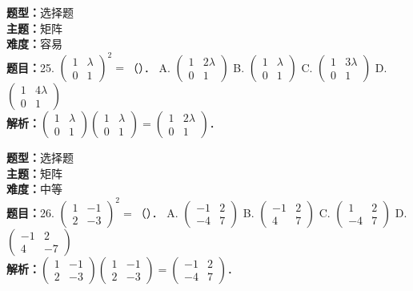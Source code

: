 \documentclass{ctexart}
\newenvironment{question}[5]{%
	\noindent\textbf{题型：}#1\\
	\textbf{主题：}#2\\
	\textbf{难度：}#3\\
	\textbf{题目：}#4\\
	\textbf{解析：}#5\\
	\vspace{1em}
}{}
\begin{document}
	\begin{question}
		{选择题}
		{矩阵}
		{容易}
		{25. \(\left(\begin{array}{ll}1 & \lambda \\ 0 & 1\end{array}\right)^2=\)（）．
			A. \(\left(\begin{array}{cc}1 & 2 \lambda \\ 0 & 1\end{array}\right)\)
			B. \(\left(\begin{array}{ll}1 & \lambda \\ 0 & 1\end{array}\right)\)
			C. \(\left(\begin{array}{cc}1 & 3 \lambda \\ 0 & 1\end{array}\right)\)
			D. \(\left(\begin{array}{cc}1 & 4 \lambda \\ 0 & 1\end{array}\right)\)}
		{\(\left(\begin{array}{ll}1 & \lambda \\ 0 & 1\end{array}\right)\left(\begin{array}{ll}1 & \lambda \\ 0 & 1\end{array}\right)=\left(\begin{array}{cc}1 & 2 \lambda \\ 0 & 1\end{array}\right)\)．}
	\end{question}
	
	\begin{question}
		{选择题}
		{矩阵}
		{中等}
		{26. \(\left(\begin{array}{ll}1 & -1 \\ 2 & -3\end{array}\right)^2=\)（）．
			A. \(\left(\begin{array}{ll}-1 & 2 \\ -4 & 7\end{array}\right)\)
			B. \(\left(\begin{array}{cc}-1 & 2 \\ 4 & 7\end{array}\right)\)
			C. \(\left(\begin{array}{cc}1 & 2 \\ -4 & 7\end{array}\right)\)
			D. \(\left(\begin{array}{cc}-1 & 2 \\ 4 & -7\end{array}\right)\)}
		{\(\left(\begin{array}{ll}1 & -1 \\ 2 & -3\end{array}\right)\left(\begin{array}{ll}1 & -1 \\ 2 & -3\end{array}\right)=\left(\begin{array}{ll}-1 & 2 \\ -4 & 7\end{array}\right)\)．}
	\end{question}
	
\end{document}
